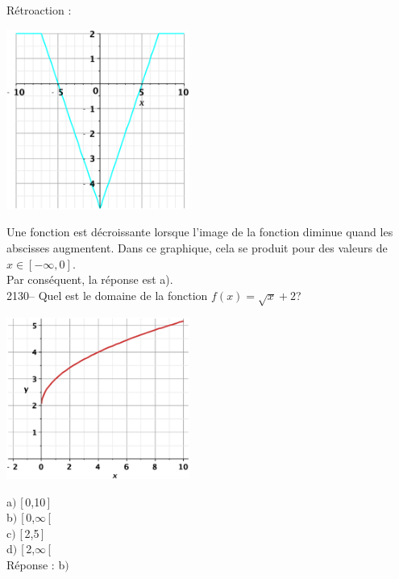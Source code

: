 \documentclass[letterpaper, 12pt]{article}
\begin{document}
R\'etroaction :\\
\begin{center}
 \includegraphics[width=6cm,bb=20 118 575 673]{Q2128.eps}
\end{center}
Une fonction est d\'ecroissante lorsque l'image de la fonction diminue quand les abscisses augmentent. Dans ce graphique, cela se produit pour des valeurs de $x\in[-\infty,0]$.\\
Par cons\'equent, la r\'eponse est a).\\


2130-- Quel est le domaine de la fonction $f(x)=\sqrt{x}+2$?\\
\begin{center}
 \includegraphics[width=6cm,bb=20 147 575 644]{Q2130.eps}
\end{center}

a$)$ [\,0,10\,]\\
b$)$ [\,0,$\infty$\,[\\
c$)$ [\,2,5\,]\\
d$)$ [\,2,$\infty$\,[\\

R\'eponse : b$)$\\
\end{document}
